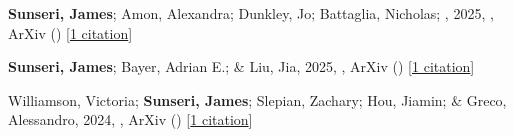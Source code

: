 \item \textbf{Sunseri, James}; Amon, Alexandra; Dunkley, Jo; Battaglia, Nicholas; \etal, 2025, , ArXiv () [\href{https://ui.adsabs.harvard.edu/abs/2025arXiv250520413S}{1 citation}]

\item \textbf{Sunseri, James}; Bayer, Adrian E.; \& Liu, Jia, 2025, , ArXiv () [\href{https://ui.adsabs.harvard.edu/abs/2025arXiv250311778S}{1 citation}]

\item Williamson, Victoria; \textbf{Sunseri, James}; Slepian, Zachary; Hou, Jiamin; \& Greco, Alessandro, 2024, , ArXiv () [\href{https://ui.adsabs.harvard.edu/abs/2024arXiv241203967W}{1 citation}]